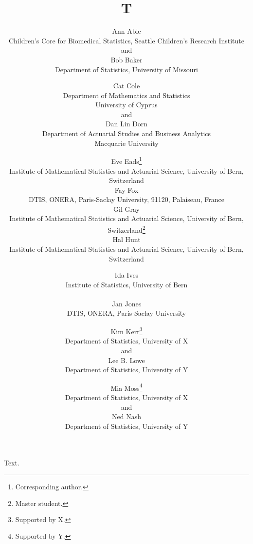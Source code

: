 \documentclass{article}
\title{T}
\author{Ann Able\hspace{.2cm}\\
Children's Core for Biomedical Statistics, Seattle Children's Research Institute\\
and \\
Bob Baker \\
Department of Statistics, University of Missouri
\and Cat Cole \hspace{.2cm}\\
Department of Mathematics and Statistics\\
University of Cyprus\\
and \\
Dan Lin Dorn \\
Department of Actuarial Studies and Business Analytics\\
Macquarie University
\and Eve Eads\thanks{Corresponding author.}\hspace{.2cm} \\
\small{Institute of Mathematical Statistics and Actuarial Science, University of Bern, Switzerland} \\[5pt]
Fay Fox \\
\small{DTIS, ONERA, Paris-Saclay University, 91120, Palaiseau, France} \\[5pt]
Gil Gray \\
\small{Institute of Mathematical Statistics and Actuarial Science, University of Bern, Switzerland}\footnote{Master
student.} \\[5pt]
Hal Hunt \\ \small{Institute of Mathematical Statistics and Actuarial Science, University of Bern, Switzerland}
\and Ida Ives\hspace{.2cm} \\
Institute of Statistics, University of Bern \\
\\
Jan Jones \\
DTIS, ONERA, Paris-Saclay University
\and Kim Kerr\thanks{Supported by X.}\hspace{.2cm} \\
Department of Statistics, University of X \\
and \\
Lee B. Lowe \\
Department of Statistics, University of Y
\and Mia Moss\thanks{Supported by Y.} \\
Department of Statistics, University of X \\
and \\
Ned Nash \\
Department of Statistics, University of Y}
\begin{document}
\maketitle
Text.
\end{document}
